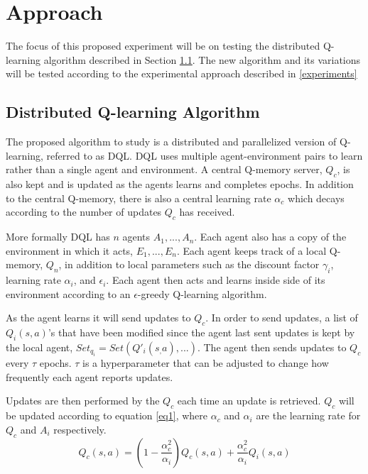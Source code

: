 \documentclass[jair,twoside,11pt,theapa]{article}
\begin{document}
\section{Approach}
\label{Approach}
The focus of this proposed experiment will be on testing the distributed Q-learning algorithm described in Section \ref{algorithm}.
The new algorithm and its variations will be tested according to the experimental approach described in \ref{experiments}

\subsection{Distributed Q-learning Algorithm} 
\label{algorithm}
The proposed algorithm to study is a distributed and parallelized version of Q-learning, referred to as DQL. 
DQL uses multiple agent-environment pairs to learn rather than a single agent and environment. A central Q-memory server, $Q_c$, is also kept and is updated 
as the agents learns and completes epochs. In addition to the central Q-memory, there is also a central learning rate $\alpha_c$ which decays according
to the number of updates $Q_c$ has received. 

More formally DQL has $n$ agents $A_1, ... , A_n$. Each agent also has a copy of the environment in which it acts, $E_1, ..., E_n$. Each agent keeps track 
of a local Q-memory, $Q_n$, in addition to local parameters such as the discount factor $\gamma_i$, learning rate $\alpha_i$, and $\epsilon_i$. Each agent then acts and learns inside side of
its environment according to an $\epsilon$-greedy Q-learning algorithm. 

As the agent learns it will send updates to $Q_c$. In order to send updates, a list of $Q_i(s,a)$'s that have been modified since the agent last sent updates is kept by the local agent,
$Set_{q_i} = Set(Q'_i(s_,a), ... )$.
The agent then sends updates to $Q_c$ every $\tau$ epochs. $\tau$ is a hyperparameter that can be adjusted to change how frequently each agent reports updates. 

Updates are then performed by the $Q_c$ each time an update is retrieved. $Q_c$ will be updated according to equation \ref{eq1},
where $\alpha_{c}$ and $\alpha_i$ are the learning rate for $Q_c$ and $A_i$ respectively. 
\begin{equation}
\label{eq1}
Q_c(s,a) = (1-\frac{\alpha_{c}^{2}}{\alpha_i})Q_c(s,a) + \frac{\alpha_{c}^{2}}{\alpha_i} Q_i(s,a)
\end{equation}
\end{document}
